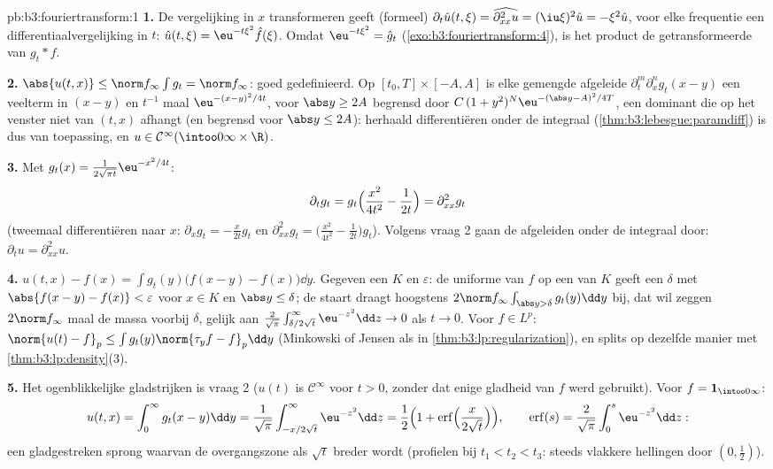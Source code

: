 \begin{solution}{pb:b3:fouriertransform:1}
\textbf{1.} De vergelijking in $x$ transformeren geeft (formeel)
$\partial_t\hat u(t,\xi) = \widehat{\partial^2_{xx}u} =
(\iu\xi)^2\hat u = -\xi^2\hat u$, voor elke frequentie een
differentiaalvergelijking in $t$: $\hat u(t,\xi) =
\eu^{-t\xi^2}\hat f(\xi)$. Omdat $\eu^{-t\xi^2} = \hat g_t$
(\cref{exo:b3:fouriertransform:4}), is het product de
getransformeerde van $g_t * f$.

\textbf{2.} $\abs{u(t,x)} \leq \norm f_\infty\int g_t = \norm
f_\infty$: goed gedefinieerd. Op $[t_0, T]\times[-A, A]$ is elke
gemengde afgeleide $\partial^m_t\partial^n_xg_t(x - y)$ een
veelterm in $(x - y)$ en $t^{-1}$ maal $\eu^{-(x-y)^2/4t}$, voor
$\abs y \geq 2A$ begrensd door $C\,(1 + y^2)^N\eu^{-(\abs y -
A)^2/4T}$, een  dominant die op het venster niet van
$(t, x)$ afhangt (en begrensd voor $\abs y \leq 2A$): herhaald
differentiëren onder de integraal
(\cref{thm:b3:lebesgue:paramdiff}) is dus van toepassing, en $u
\in \mathcal C^\infty(\intoo0\infty\times\R)$.

\textbf{3.} Met $g_t(x) = \frac1{2\sqrt{\pi t}}\eu^{-x^2/4t}$:
\[
\partial_tg_t = g_t\Bigl(\frac{x^2}{4t^2} - \frac1{2t}\Bigr)
= \partial^2_{xx}g_t
\]
(tweemaal differentiëren naar $x$: $\partial_xg_t = -\frac
x{2t}g_t$ en $\partial^2_{xx}g_t = \bigl(\frac{x^2}{4t^2} -
\frac1{2t}\bigr)g_t$). Volgens vraag 2 gaan de afgeleiden onder
de integraal door: $\partial_tu = \partial^2_{xx}u$.

\textbf{4.} $u(t,x) - f(x) = \int g_t(y)\bigl(f(x - y) -
f(x)\bigr)\dd y$. Gegeven een  $K$ en $\varepsilon$: de
uniforme  van $f$ op een  van $K$ geeft een
$\delta$ met $\abs{f(x-y) - f(x)} < \varepsilon$ voor $x \in K$
en $\abs y \leq \delta$; de staart draagt hoogstens $2\norm
f_\infty\int_{\abs y > \delta}g_t(y)\dd y$ bij, dat wil zeggen
$2\norm f_\infty$ maal de massa voorbij $\delta$, gelijk aan
$\frac2{\sqrt\pi}\int_{\delta/2\sqrt t}^\infty\eu^{-z^2}\dd z \to
0$ als $t \to 0$. Voor $f \in L^p$: $\norm{u(t) - f}_p \leq \int
g_t(y)\norm{\tau_yf - f}_p\dd y$ (Minkowski of Jensen als in
\cref{thm:b3:lp:regularization}), en splits op dezelfde manier
met \cref{thm:b3:lp:density}(3).

\textbf{5.} Het ogenblikkelijke gladstrijken is vraag 2 ($u(t)$
is $\mathcal C^\infty$ voor $t > 0$, zonder dat enige gladheid
van $f$ werd gebruikt). Voor $f = \mathbf 1_{\intoo0\infty}$:
\[
u(t, x) = \int_0^\infty g_t(x - y)\dd y
= \frac1{\sqrt\pi}\int_{-x/2\sqrt t}^{\infty}\eu^{-z^2}\dd z
= \frac12\Bigl(1 +
\operatorname{erf}\Bigl(\frac{x}{2\sqrt t}\Bigr)\Bigr),
\qquad \operatorname{erf}(s) =
\frac2{\sqrt\pi}\int_0^s\eu^{-z^2}\dd z :
\]
een gladgestreken sprong waarvan de overgangszone als $\sqrt t$
breder wordt (profielen bij $t_1 < t_2 < t_3$: steeds vlakkere
hellingen door $(0, \frac12)$).


\end{solution}
